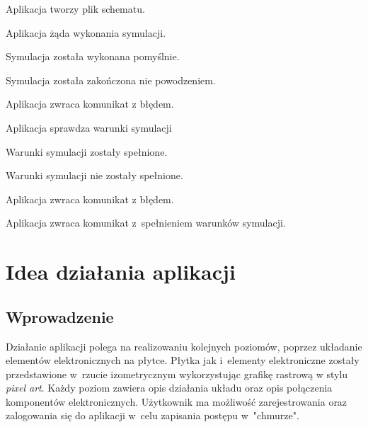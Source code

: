 \documentclass[12pt,a4paper]{article} %
\begin{document}
\hfill \break
\begin{usecase}
	\noaka
	\addpath
	\begin{usecases}
		\item Aplikacja tworzy plik schematu.
		\item Aplikacja żąda wykonania symulacji.
		\item Symulacja została wykonana pomyślnie.
		\begin{usecases}
			\item Symulacja została zakończona nie powodzeniem.
			\begin{usecases}
				\item Aplikacja zwraca komunikat z błędem.
			\end{usecases}
		\end{usecases}
		\item Aplikacja sprawdza warunki symulacji
		\item Warunki symulacji zostały spełnione.
		\begin{usecases}
			\item Warunki symulacji nie zostały spełnione.
			\begin{usecases}
				\item Aplikacja zwraca komunikat z błędem.
			\end{usecases}
		\end{usecases}
		\item Aplikacja zwraca komunikat z~spełnieniem warunków symulacji.
	\end{usecases}
\end{usecase}

\clearpage
\section{Idea działania aplikacji}
\subsection{Wprowadzenie}
\aka Działanie aplikacji polega na realizowaniu kolejnych poziomów, poprzez układanie elementów elektronicznych na płytce. Płytka jak i~elementy elektroniczne zostały przedstawione w~rzucie izometrycznym wykorzystując grafikę rastrową w stylu \textit{pixel art}. Każdy poziom zawiera opis działania układu oraz opis połączenia komponentów elektronicznych. Użytkownik ma możliwość zarejestrowania oraz zalogowania się do aplikacji w~celu zapisania postępu  w~"chmurze".
\end{document}
